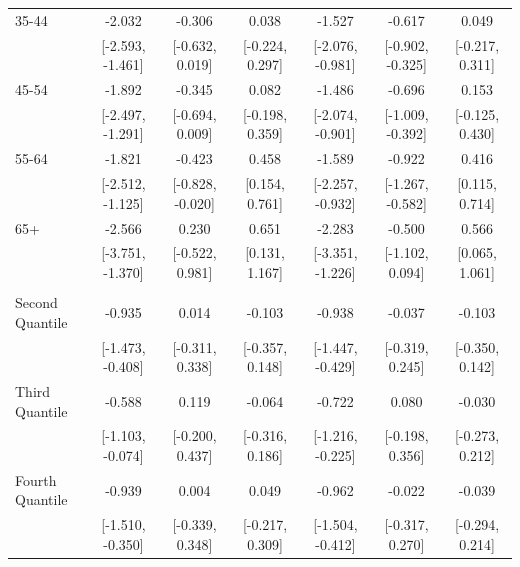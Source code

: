 \documentclass[
  10,
  letterpaper,
  DIV=11,
  numbers=noendperiod]{scrartcl}
\begin{document}
\begin{table}
\begin{tabular}[t]{lcccccc}
\hspace{1em}35-44 & -2.032 & -0.306 & 0.038 & -1.527 & -0.617 & 0.049\\
\hspace{1em} & {}[-2.593, -1.461] & {}[-0.632, 0.019] & {}[-0.224, 0.297] & {}[-2.076, -0.981] & {}[-0.902, -0.325] & {}[-0.217, 0.311]\\
\hspace{1em}45-54 & -1.892 & -0.345 & 0.082 & -1.486 & -0.696 & 0.153\\
\hspace{1em} & {}[-2.497, -1.291] & {}[-0.694, 0.009] & {}[-0.198, 0.359] & {}[-2.074, -0.901] & {}[-1.009, -0.392] & {}[-0.125, 0.430]\\
\hspace{1em}55-64 & -1.821 & -0.423 & 0.458 & -1.589 & -0.922 & 0.416\\
\hspace{1em} & {}[-2.512, -1.125] & {}[-0.828, -0.020] & {}[0.154, 0.761] & {}[-2.257, -0.932] & {}[-1.267, -0.582] & {}[0.115, 0.714]\\
\hspace{1em}65+ & -2.566 & 0.230 & 0.651 & -2.283 & -0.500 & 0.566\\
\hspace{1em} & {}[-3.751, -1.370] & {}[-0.522, 0.981] & {}[0.131, 1.167] & {}[-3.351, -1.226] & {}[-1.102, 0.094] & {}[0.065, 1.061]\\
\addlinespace[0.3em]
\multicolumn{7}{l}{\cellcolor[HTML]{3498DB}{\textbf{Income}}}\\
\hspace{1em}Second Quantile & -0.935 & 0.014 & -0.103 & -0.938 & -0.037 & -0.103\\
\hspace{1em} & {}[-1.473, -0.408] & {}[-0.311, 0.338] & {}[-0.357, 0.148] & {}[-1.447, -0.429] & {}[-0.319, 0.245] & {}[-0.350, 0.142]\\
\hspace{1em}Third Quantile & -0.588 & 0.119 & -0.064 & -0.722 & 0.080 & -0.030\\
\hspace{1em} & {}[-1.103, -0.074] & {}[-0.200, 0.437] & {}[-0.316, 0.186] & {}[-1.216, -0.225] & {}[-0.198, 0.356] & {}[-0.273, 0.212]\\
\hspace{1em}Fourth Quantile & -0.939 & 0.004 & 0.049 & -0.962 & -0.022 & -0.039\\
\hspace{1em} & {}[-1.510, -0.350] & {}[-0.339, 0.348] & {}[-0.217, 0.309] & {}[-1.504, -0.412] & {}[-0.317, 0.270] & {}[-0.294, 0.214]\\

\end{tabular}
\end{table}
\end{document}
